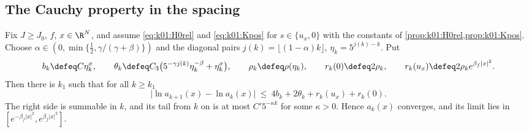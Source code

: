 \subsection{The Cauchy property in the spacing}\label{ssec:k01:CA}

\begin{theorem}\label{thm:k01:CA}
Fix $J\ge J_0$, $f$, $x\in\R^N$, and assume \eqref{eq:k01:H0rel} and \eqref{eq:k01:Kpos} for $s\in\{u_x,0\}$ with the constants of \cref{prop:k01:H0rel,prop:k01:Kpos}. Choose $\alpha\in(0,\min\{\frac12,\gamma/(\gamma+\beta)\})$ and the diagonal pairs $j(k)=\lfloor(1-\alpha)k\rfloor$, $\eta_k=5^{j(k)-k}$. Put
\[
b_k\defeq C\eta_k^{\sigma},\qquad \theta_k\defeq C_3\big(5^{-\gamma j(k)}\eta_k^{-\beta}+\eta_k^{\sigma}\big),\qquad \rho_k\defeq\rho(\eta_k),\qquad r_k(0)\defeq2\rho_k,\qquad r_k(u_x)\defeq2\rho_ke^{\beta_f|x|^2}.
\]
Then there is $k_1$ such that for all $k\ge k_1$
\begin{equation}\label{eq:k01:CA}
\big|\ln a_{k+1}(x)-\ln a_k(x)\big|\ \le\ 4b_k+2\theta_k+r_k(u_x)+r_k(0).
\end{equation}
The right side is summable in $k$, and its tail from $k$ on is at most $C'5^{-\kappa k}$ for some $\kappa>0$. Hence $a_k(x)$ converges, and its limit lies in $[e^{-\beta_f|x|^2},e^{\beta_f|x|^2}]$.
\end{theorem}

